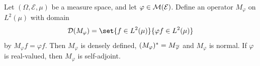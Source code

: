 \documentclass[article, a4paper, 11pt, oneside]{memoir}
\let\phi\varphi
\numberwithin{equation}{chapter}
\newcommand{\calE}{\mathcal{E}}
\newcommand{\dom}{\mathcal{D}}
\newcommand{\fxnote}[1]{}
\theoremstyle{myexample}
\theoremstyle{myexample}
\theoremstyle{myexamplebreak}
\theoremstyle{myexamplebreak}
\theoremstyle{nonumberplain}
\theoremstyle{MyNonumberplain}
\begin{document}



\begin{theorem}
    \label{thm:multiplication_operator}
    Let $(\Omega, \calE, \mu)$ be a measure space, and let $\phi \in \measurable(\calE)$. Define an operator $M_\phi$ on $L^2(\mu)$ with domain
    \begin{equation*}
        \dom(M_\phi) = \set{ f \in L^2(\mu) }{ \phi f \in L^2(\mu) }
    \end{equation*}
    by $M_\phi f = \phi f$. Then $M_\phi$ is densely defined, $(M_\phi)^* = M_{\conj{\phi}}$ and $M_\phi$ is normal. If $\phi$ is real-valued, then $M_\phi$ is self-adjoint.
\end{theorem}
\end{document}
